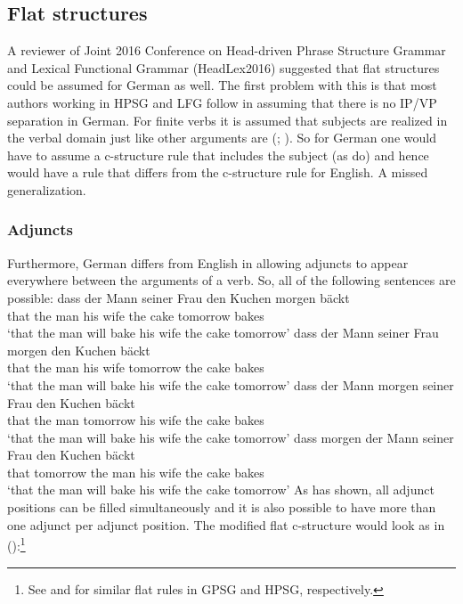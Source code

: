 \subsection{Flat structures}

A reviewer of Joint 2016 Conference on Head-driven Phrase Structure Grammar and Lexical Functional
Grammar (HeadLex2016) suggested that flat structures could be assumed for German as well. The
first problem with this is that most authors working in HPSG and LFG follow \citet{Haider93a}
in assuming that there is no IP/VP separation in German. For finite verbs it is assumed that
subjects are realized in the verbal domain just like other arguments are (\citealp[Section~3.2.2, Section~3.2.3]{Berman2003a}; \citealp[]{ZK2002a}). So for German one would
have to assume a c-structure rule that includes the subject (as \citealp[]{ZK2002a} do) and
hence would have a rule that differs from the c-structure rule for English. A missed generalization.



\subsubsection{Adjuncts}

\largerpage
Furthermore, German differs from English in allowing adjuncts to appear everywhere between the
arguments of a verb. So, all of the following sentences are possible:
\eal
\ex 
\gll dass der Mann seiner Frau den Kuchen morgen bäckt\\
     that the man  his    wife the cake   tomorrow bakes\\
\glt `that the man will bake his wife the cake tomorrow'
\ex 
\gll dass der Mann seiner Frau morgen den Kuchen bäckt\\
     that the man  his    wife tomorrow the cake   bakes\\
\glt `that the man will bake his wife the cake tomorrow'
\ex 
\gll dass der Mann morgen seiner Frau den Kuchen bäckt\\
     that the man  tomorrow  his    wife the cake   bakes\\
\glt `that the man will bake his wife the cake tomorrow'
\ex 
\gll dass morgen der Mann seiner Frau den Kuchen bäckt\\
     that tomorrow the man  his    wife the cake    bakes\\
\glt `that the man will bake his wife the cake tomorrow'
\zl
As \citet{Uszkoreit87a} has shown, all adjunct positions can be filled simultaneously and it is also
possible to have more than one adjunct per adjunct position. The modified flat c-structure would
look as in ():\footnote{%
  See \citet[]{Uszkoreit87a} and \citet{Kasper94a} for similar flat rules in GPSG and HPSG,
  respectively.
}

